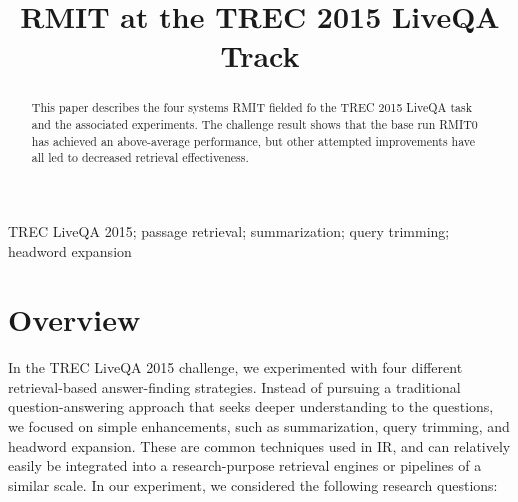 \documentclass[a4paper,10pt,conference,compsocconf,final]{IEEEtran}
\newcommand{\opstyle}[1]{\mbox{\textsc{#1}}}
\begin{document}

\title{RMIT at the TREC 2015 LiveQA Track}
\author{
}

\maketitle

\begin{abstract} This paper describes the four systems RMIT fielded fo the
  \opstyle{TREC} 2015 LiveQA task and the associated experiments.  The
  challenge result shows that the base run RMIT0 has achieved an above-average
  performance, but other attempted improvements have all led to decreased
  retrieval effectiveness.
\end{abstract}

\begin{IEEEkeywords} 
  \opstyle{TREC} LiveQA 2015; passage retrieval; summarization; query trimming; headword expansion
\end{IEEEkeywords}

\section{Overview}
\label{overview}
In the TREC LiveQA 2015 challenge, we experimented with four
different retrieval-based answer-finding strategies.
Instead of pursuing a traditional question-answering approach that
seeks deeper understanding to the questions, we focused on simple
enhancements, such as summarization, query trimming, and headword
expansion.
These are common techniques used in IR, and can relatively easily be
integrated into a research-purpose retrieval engines or pipelines of
a similar scale.
In our experiment, we considered the following research
questions:
\end{document}
